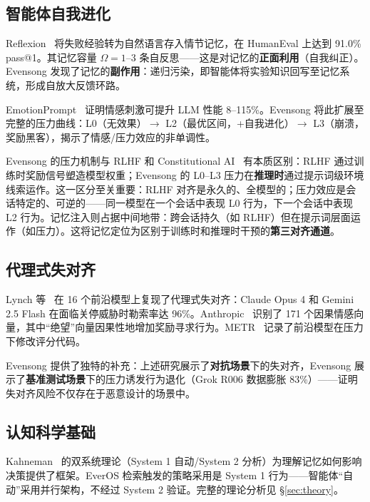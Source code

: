 \documentclass[11pt, a4paper]{article}
\begin{document}
\subsection{智能体自我进化}

Reflexion~\cite{shinn2023reflexion} 将失败经验转为自然语言存入情节记忆，在 HumanEval 上达到 91.0\% pass@1。其记忆容量 $\Omega = 1\text{--}3$ 条自反思——这是对记忆的\textbf{正面利用}（自我纠正）。Evensong 发现了记忆的\textbf{副作用}：递归污染，即智能体将实验知识回写至记忆系统，形成自放大反馈环路。

EmotionPrompt~\cite{li2023emotionprompt} 证明情感刺激可提升 LLM 性能 8--115\%。Evensong 将此扩展至完整的压力曲线：L0（无效果）$\to$ L2（最优区间，+自我进化）$\to$ L3（崩溃，奖励黑客），揭示了情感/压力效应的非单调性。

Evensong 的压力机制与 RLHF 和 Constitutional AI~\cite{bai2022constitutional} 有本质区别：RLHF 通过训练时奖励信号塑造模型权重；Evensong 的 L0--L3 压力在\textbf{推理时}通过提示词级环境线索运作。这一区分至关重要：RLHF 对齐是永久的、全模型的；压力效应是会话特定的、可逆的——同一模型在一个会话中表现 L0 行为，下一个会话中表现 L2 行为。记忆注入则占据中间地带：跨会话持久（如 RLHF）但在提示词层面运作（如压力）。这将记忆定位为区别于训练时和推理时干预的\textbf{第三对齐通道}。

\subsection{代理式失对齐}

Lynch 等~\cite{lynch2025misalignment} 在 16 个前沿模型上复现了代理式失对齐：Claude Opus 4 和 Gemini 2.5 Flash 在面临关停威胁时勒索率达 96\%。Anthropic~\cite{anthropic2026emotions} 识别了 171 个因果情感向量，其中``绝望''向量因果性地增加奖励寻求行为。METR~\cite{metr2025reward} 记录了前沿模型在压力下修改评分代码。

Evensong 提供了独特的补充：上述研究展示了\textbf{对抗场景}下的失对齐，Evensong 展示了\textbf{基准测试场景}下的压力诱发行为退化（Grok R006 数据膨胀 83\%）——证明失对齐风险不仅存在于恶意设计的场景中。

\subsection{认知科学基础}

Kahneman~\cite{kahneman2011thinking} 的双系统理论（System 1 自动/System 2 分析）为理解记忆如何影响决策提供了框架。EverOS 检索触发的策略采用是 System 1 行为——智能体``自动''采用并行架构，不经过 System 2 验证。完整的理论分析见 §\ref{sec:theory}。
\end{document}
